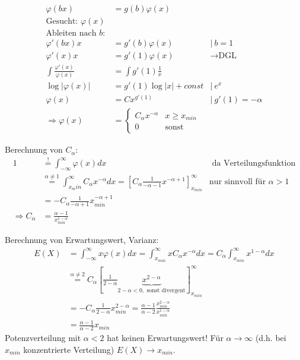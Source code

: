\documentclass[10pt,a4paper]{scrartcl}
\begin{document}
\begin{align*}
    \varphi(bx) &= g(b) \varphi(x) \\
     \text{Gesucht: } \varphi(x) \\
     \text{Ableiten nach }b: \\
     \varphi'(bx) x &= g'(b)\varphi(x) & |\  b = 1\\
     \varphi'(x)x &= g'(1) \varphi(x) & \rightarrow \text{DGL} \\
     \int \frac{\varphi'(x)}{\varphi(x)} &= \int g'(1)\frac{1}{x} \\
     \log |\varphi(x)| &= g'(1) \log |x| + const & |\ e^x \\
     \varphi(x) &= C x^{g'(1)} & |\ g'(1) = -\alpha\\
     \Longrightarrow \varphi(x)& = \begin{cases} C_\alpha x^{-\alpha} & x\ge x_{min} \\ 0 & \text{sonst} \end{cases}
\end{align*}

Berechnung von $C_\alpha$:
\begin{align*}
    1 &\stackrel{!}{=} \int_{-\infty}^\infty \varphi(x) dx & \text{ da Verteilungsfunktion} \\
      &\stackrel{\alpha\neq 1}{=} \int_{x_min}^\infty C_\alpha x^{-\alpha} dx = \left[C_\alpha \frac{1}{-\alpha-1} x^{-\alpha+1}\right]_{x_{min}}^\infty & \text{nur sinnvoll für } \alpha>1\\
      &= -C_\alpha \frac{1}{-\alpha+1}x_{min}^{-\alpha+1} \\
      \Rightarrow C_\alpha &= \frac{\alpha-1}{x_{min}^{1-\alpha}}
\end{align*}

Berechnung von Erwartungswert, Varianz:
\begin{align*}
    E(X) & = \int_{-\infty}^\infty x \varphi(x) dx = \int_{x_{min}}^\infty x C_\alpha x^{-\alpha} dx =  C_\alpha \int_{x_{min}}^\infty x^{1-\alpha} dx \\
         & \stackrel{\alpha\neq2}{=} C_\alpha \left[ \frac{1}{2-\alpha} \underbrace{x^{2-\alpha}}_{2-\alpha < 0, \text{ sonst divergent}} \right]_{x_{min}}^\infty \\
         & = -C_\alpha \frac{1}{2-\alpha} x_{min}^{2-\alpha} = \frac{\alpha-1}{\alpha-2} \frac{x_{min}^{2-\alpha}}{x_{min}^{1-\alpha}} \\
         & = \frac{\alpha-1}{\alpha-2} x_{min}
\end{align*}
Potenzverteilung mit $\alpha < 2$ hat keinen Erwartungswert!
Für $\alpha\to\infty$ (d.h. bei $x_{min}$ konzentrierte Verteilung) $E(X) \to x_{min}$.
\end{document}
